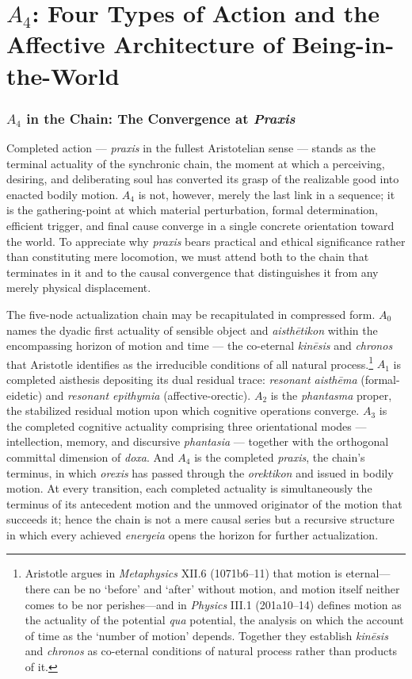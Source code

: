 \documentclass{article}
\begin{document}
\section{\texorpdfstring{$A_4$}{A4}: Four Types of Action and the Affective Architecture of Being-in-the-World}

\subsubsection*{$A_4$ in the Chain: The Convergence at \textit{Praxis}}

Completed action --- \textit{praxis} in the fullest Aristotelian sense --- stands as the terminal actuality of the synchronic chain, the moment at which a perceiving, desiring, and deliberating soul has converted its grasp of the realizable good into enacted bodily motion. $A_4$ is not, however, merely the last link in a sequence; it is the gathering-point at which material perturbation, formal determination, efficient trigger, and final cause converge in a single concrete orientation toward the world. To appreciate why \textit{praxis} bears practical and ethical significance rather than constituting mere locomotion, we must attend both to the chain that terminates in it and to the causal convergence that distinguishes it from any merely physical displacement.

The five-node actualization chain may be recapitulated in compressed form. $A_0$ names the dyadic first actuality of sensible object and \textit{aisth\={e}tikon} within the encompassing horizon of motion and time --- the co-eternal \textit{kin\={e}sis} and \textit{chronos} that Aristotle identifies as the irreducible conditions of all natural process.\footnote{Aristotle argues in \textit{Metaphysics} XII.6 (1071b6--11) that motion is eternal---there can be no `before' and `after' without motion, and motion itself neither comes to be nor perishes---and in \textit{Physics} III.1 (201a10--14) defines motion as the actuality of the potential \textit{qua} potential, the analysis on which the account of time as the `number of motion' depends. Together they establish \textit{kin\={e}sis} and \textit{chronos} as co-eternal conditions of natural process rather than products of it.} $A_1$ is completed aisthesis depositing its dual residual trace: \textit{resonant aisth\={e}ma} (formal-eidetic) and \textit{resonant epithymia} (affective-orectic). $A_2$ is the \textit{phantasma} proper, the stabilized residual motion upon which cognitive operations converge. $A_3$ is the completed cognitive actuality comprising three orientational modes --- intellection, memory, and discursive \textit{phantasia} --- together with the orthogonal committal dimension of \textit{doxa}. And $A_4$ is the completed \textit{praxis}, the chain's terminus, in which \textit{orexis} has passed through the \textit{orektikon} and issued in bodily motion. At every transition, each completed actuality is simultaneously the terminus of its antecedent motion and the unmoved originator of the motion that succeeds it; hence the chain is not a mere causal series but a recursive structure in which every achieved \textit{energeia} opens the horizon for further actualization.
\end{document}
